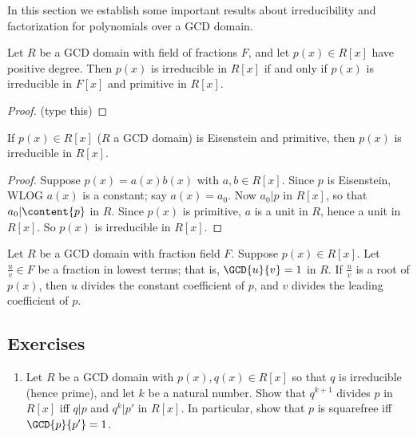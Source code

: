 \documentclass{article}
\begin{document}

In this section we establish some important results about irreducibility and factorization for polynomials over a GCD domain.

\begin{prop}
Let $R$ be a GCD domain with field of fractions $F$, and let $p(x) \in R[x]$ have positive degree. Then $p(x)$ is irreducible in $R[x]$ if and only if $p(x)$ is irreducible in $F[x]$ and primitive in $R[x]$.
\end{prop}

\begin{proof}
(type this)
\end{proof}

\begin{cor}
If $p(x) \in R[x]$ ($R$ a GCD domain) is Eisenstein and primitive, then $p(x)$ is irreducible in $R[x]$.
\end{cor}

\begin{proof}
Suppose $p(x) = a(x)b(x)$ with $a,b \in R[x]$. Since $p$ is Eisenstein, WLOG $a(x)$ is a constant; say $a(x) = a_0$. Now $a_0|p$ in $R[x]$, so that $a_0|\content{p}$ in $R$. Since $p(x)$ is primitive, $a$ is a unit in $R$, hence a unit in $R[x]$. So $p(x)$ is irreducible in $R[x]$.
\end{proof}

\begin{prop}
Let $R$ be a GCD domain with fraction field $F$. Suppose $p(x) \in R[x]$. Let $\frac{u}{v} \in F$ be a fraction in lowest terms; that is, $\GCD{u}{v} = 1$ in $R$. If $\frac{u}{v}$ is a root of $p(x)$, then $u$ divides the constant coefficient of $p$, and $v$ divides the leading coefficient of $p$.
\end{prop}

\subsection*{Exercises}

\begin{enumerate}
\item Let $R$ be a GCD domain with $p(x), q(x) \in R[x]$ so that $q$ is irreducible (hence prime), and let $k$ be a natural number. Show that $q^{k+1}$ divides $p$ in $R[x]$ iff $q|p$ and $q^k|p'$ in $R[x]$. In particular, show that $p$ is squarefree iff $\GCD{p}{p'} = 1$. 
\end{enumerate}
\end{document}
